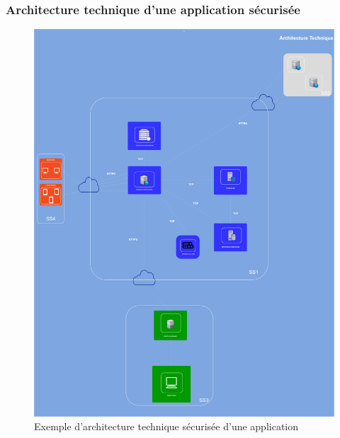 \subsubsection{Architecture technique d'une application sécurisée}
\begin{figure}[H]
	\centering
	\begin{minipage}{12cm}
		\centering
		\includegraphics[width=1\linewidth,height=0.90\textheight]{parts/part04/chapters/conception/fig/ArchitectureHubsoWebApplications.png}
	\end{minipage}
	\caption{Exemple d'architecture technique sécurisée d'une application}
	\label{fig:architecturedet}
\end{figure}
